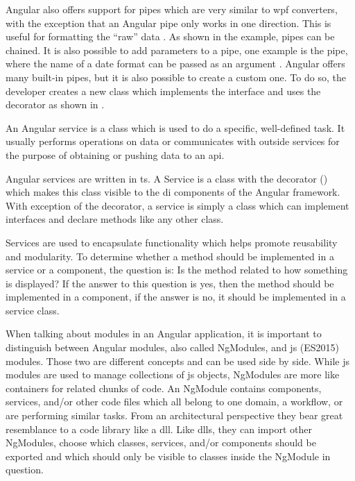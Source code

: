 Angular also offers support for pipes which are very similar to \gls{wpf} converters, with the exception that an Angular pipe only works in one direction. This is useful for formatting the \enquote{raw} data \zB {}. As shown in the example, pipes can be chained. It is also possible to add parameters to a pipe, one example is the  pipe, where the name of a date format can be passed as an argument \zB {}. Angular offers many built-in pipes, but it is also possible to create a custom one. To do so, the developer creates a new class which implements the  interface and uses the  decorator as shown in . \cite{angularTemplateSyntax}




An Angular service is a class which is used to do a specific, well-defined task. It usually performs operations on data or communicates with outside services for the purpose of obtaining or pushing data to an \gls{api}.


Angular services are written in \gls{ts}. A Service is a class with the  decorator () which makes this class visible to the \gls{di} components of the Angular framework. With exception of the decorator, a service is simply a class which can implement interfaces and declare methods like any other class.

Services are used to encapsulate functionality which helps promote reusability and modularity. To determine whether a method should be implemented in a service or a component, the question is: Is the method related to how something is displayed? If the answer to this question is yes, then the method should be implemented in a component, if the answer is no, it should be implemented in a service class.



When talking about modules in an Angular application, it is important to distinguish between Angular modules, also called NgModules, and \gls{js} (ES2015) modules. Those two are different concepts and can be used side by side. While \gls{js} modules are used to manage collections of \gls{js} objects, NgModules are more like containers for related chunks of code. An NgModule contains components, services, and/or other code files which all belong to one domain, a workflow, or are performing similar tasks. From an architectural perspective they bear great resemblance to a code library like a \gls{dll}. Like \gls{dll}s, they can import other NgModules, choose which classes, services, and/or components should be exported and which should only be visible to classes inside the NgModule in question.

